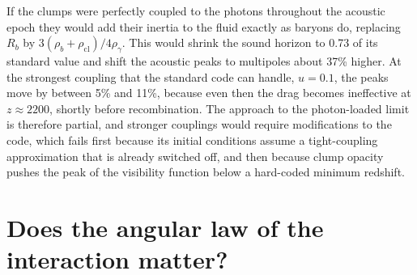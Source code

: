 \documentclass[11pt,a4paper]{article}
\newcommand{\cl}{\mathrm{cl}}
\begin{document}
If the clumps were perfectly coupled to the photons throughout the acoustic epoch they would add their inertia to the fluid exactly as baryons do, replacing $R_b$ by $3(\rho_b+\rho_\cl)/4\rho_\gamma$. This would shrink the sound horizon to 0.73 of its standard value and shift the acoustic peaks to multipoles about 37\% higher. At the strongest coupling that the standard code can handle, $u=0.1$, the peaks move by between 5\% and 11\%, because even then the drag becomes ineffective at $z\approx2200$, shortly before recombination. The approach to the photon-loaded limit is therefore partial, and stronger couplings would require modifications to the code, which fails first because its initial conditions assume a tight-coupling approximation that is already switched off, and then because clump opacity pushes the peak of the visibility function below a hard-coded minimum redshift.

\section{Does the angular law of the interaction matter?}
\label{sec:kernel}
\end{document}
